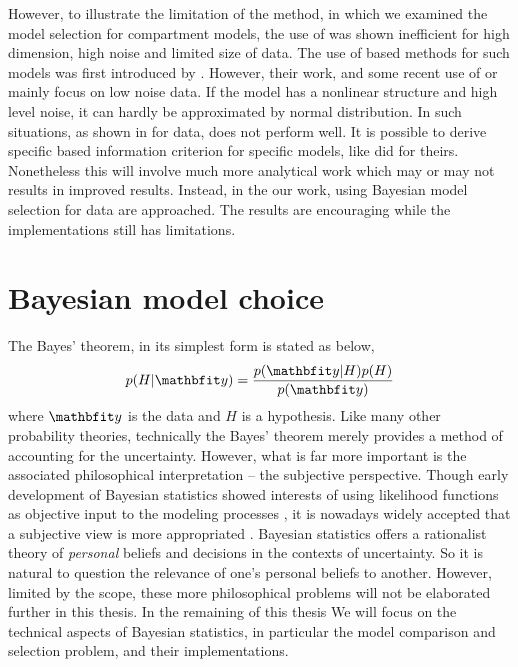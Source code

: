 However, to illustrate the limitation of the \aicc method, in
\textcite{Zhou:2011uo} which we examined the model selection for compartment
models, the use of \aicc was shown inefficient for high dimension, high noise
and limited size of data. The use of \aic based methods for such models was
first introduced by \textcite{Hawkins:1986ha}. However, their work, and some
recent use of \aic or \aicc mainly focus on low noise data. If the model has a
nonlinear structure and high level noise, it can hardly be approximated by
normal distribution. In such situations, as shown in \textcite{Zhou:2011uo}
for \pet data, \aicc does not perform well. It is possible to derive specific
\aic based information criterion for specific models, like
\textcite{Hurvich:1989ev} did for theirs. Nonetheless this will involve much
more analytical work which may or may not results in improved results.
Instead, in the our work, using Bayesian model selection for \pet data are
approached. The results are encouraging while the implementations still has
limitations.

\section{Bayesian model choice}
\label{sec:Bayesian model choice}

The Bayes' theorem, in its simplest form is stated as below,
\begin{equation}
  p(H|\data) = \frac{p(\data|H)p(H)}{p(\data)} \label{eq:bayes}
\end{equation}
where $\data$ is the data and $H$ is a hypothesis. Like many other probability
theories, technically the Bayes' theorem merely provides a method of
accounting for the uncertainty. However, what is far more important is the
associated philosophical interpretation -- the subjective perspective. Though
early development of Bayesian statistics showed interests of using likelihood
functions as objective input to the modeling processes
\parencite{Jeffreys:1961ua, Jeffreys:1946jf}, it is nowadays widely accepted
that a subjective view is more appropriated
\parencite[see][chap.~1]{Bernardo:1994vd}. Bayesian statistics offers a
rationalist theory of \emph{personal} beliefs and decisions in the contexts of
uncertainty. So it is natural to question the relevance of one's personal
beliefs to another. However, limited by the scope, these more philosophical
problems will not be elaborated further in this thesis. In the remaining of
this thesis We will focus on the technical aspects of Bayesian statistics, in
particular the model comparison and selection problem, and their
implementations.

